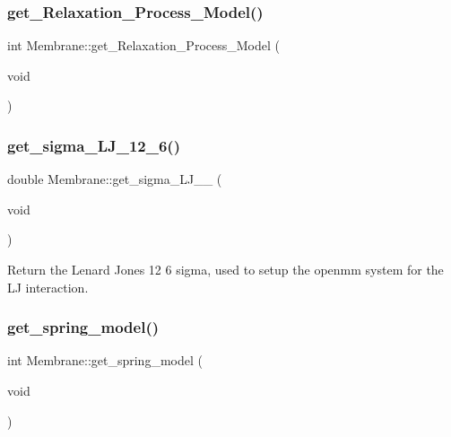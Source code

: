 \mbox{\label{classMembrane_adb66c58c9e5a24936c5ac2ec9bd42290}} 
\subsubsection{\texorpdfstring{get\_Relaxation\_Process\_Model()}{get\_Relaxation\_Process\_Model()}}
{\footnotesize\ttfamily int Membrane\+::get\+\_\+\+Relaxation\+\_\+\+Process\+\_\+\+Model (\begin{DoxyParamCaption}\item[{void}]{ }\end{DoxyParamCaption})\hspace{0.3cm}{\ttfamily [inline]}}

\mbox{\label{classMembrane_af24a7560c8a747fc22c0f21358373334}} 
\subsubsection{\texorpdfstring{get\_sigma\_LJ\_12\_6()}{get\_sigma\_LJ\_12\_6()}}
{\footnotesize\ttfamily double Membrane\+::get\+\_\+sigma\+\_\+\+L\+J\+\_\+\_ (\begin{DoxyParamCaption}\item[{void}]{ }\end{DoxyParamCaption})\hspace{0.3cm}{\ttfamily [inline]}}

Return the Lenard Jones 12 6 sigma, used to setup the openmm system for the LJ interaction. \mbox{\label{classMembrane_aa567e00a8c4c4b4a57547b84e80e418e}} 
\subsubsection{\texorpdfstring{get\_spring\_model()}{get\_spring\_model()}}
{\footnotesize\ttfamily int Membrane\+::get\+\_\+spring\+\_\+model (\begin{DoxyParamCaption}\item[{void}]{ }\end{DoxyParamCaption})\hspace{0.3cm}{\ttfamily [inline]}}

